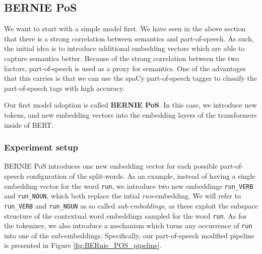 \documentclass[a4paper,12pt,oneside,openright]{report}
\begin{document}
\subsection{BERNIE PoS} \label{bernie_pos}

We want to start with a simple model first.
We have seen in the above section that there is a strong correlation between semantics and part-of-speech.
As such, the initial idea is to introduce additional embedding vectors which are able to capture semantics better.
Because of the strong correlation between the two factors, part-of-speech is used as a proxy for semantics.
One of the advantages that this carries is that we can use the spaCy part-of-speech tagger \cite{spacyb} to classify the part-of-speech tags with high accuracy.

Our first model adoption is called \textbf{BERNIE PoS}.
In this case, we introduce new tokens, and new embedding vectors into the embedding layers of the transformers inside of BERT.

\subsubsection{Experiment setup}

BERNIE PoS introduces one new embedding vector for each possible part-of-speech configuration of the split-words.
As an example, instead of having a single embedding vector for the word \Verb#run#, we introduce two new embeddings \Verb#run_VERB# and \Verb#run_NOUN#, which both replace the intial \textit{run}-embedding. 
We will refer to \Verb#run_VERB# and \Verb#run_NOUN# as so called \textit{sub-embeddings}, as these exploit the subspace structure of the contextual word embeddings sampled for the word \Verb#run#.
As for the tokenizer, we also introduce a mechanism which turns any occurrence of \Verb#run# into one of the sub-embeddings.
Specifically, our part-of-speech modified pipeline is presented in Figure \ref{fig:BERnie_POS_pipeline}.
\end{document}
